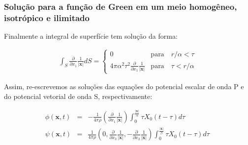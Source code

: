 \documentclass[xcolor=table]{beamer}
\newcommand{\xvec}{\mathbf{x}}
\begin{document}
\begin{frame}
\frametitle{\textbf{Solu\c{c}\~ao para a fun\c{c}\~ao de Green em um meio homog\^eneo, isotr\'opico e ilimitado}}

\begin{flushleft}
Finalmente a integral de superf\'icie tem solu\c{c}\~ao da forma:
\end{flushleft}
\begin{align*}
 \int_{S} \frac{\partial}{\partial x_1 } \frac{1}{\left| \xvec \right| }dS =\begin{cases}
 0  &\mbox{para}\quad  r/\alpha < \tau\\
 4\pi \alpha^2 \tau^2 \frac{\partial }{\partial x_1} \frac{1}{|\xvec|}  &\mbox{para}\quad \tau < r/\alpha
\end{cases}
\end{align*}

\begin{flushleft}
Assim, re-escrevemos as solu\c{c}\~oes das equa\c{c}\~oes do potencial escalar de onda P e 
do potencial vetorial de onda S, respectivamente: 
\end{flushleft}
\begin{eqnarray}
  \label{ten1}
       \phi(\xvec,t) &=& - \frac{1}{4\pi \rho}  \left( \frac{\partial }{\partial x_1} \frac{1}{\left| \xvec\right|} \right)  \int_{0}^{\frac{\left| \xvec\right|}{\alpha}} \tau X_{0}\left( t -\tau \right)  d\tau\, \\
       \psi(\xvec,t) &=& \frac{1}{4\pi\rho}  \left(0, \frac{\partial }{\partial x_3} \frac{1}{\left| \xvec \right|}, -\frac{\partial }{\partial x_2} \frac{1}{\left| \xvec \right|} \right) \int_{0}^{\frac{\left| \xvec\right|}{\beta}} \tau X_{0}\left( t -\tau \right)  d\tau\, 
\end{eqnarray}

\end{frame}%
\end{document}
